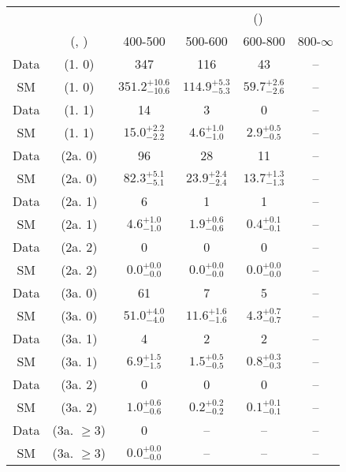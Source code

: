 \begin{table}[h!]
\tiny
\centering
{}
\begin{tabular}
{cccccc}
	\hline\hline
&	&	& \multicolumn{4}{c}{\scalht (\gev)}\\ 
	&	 (\njet, \nb) & 400-500 & 500-600 & 600-800 & 800-$\infty$ \\ [0.8ex] 
\hline
	Data & (1. 0) & 347 & 116 & 43 & -- \\[0.5ex] 
	SM & (1. 0) & $351.2^{+ 10.6 }_{- 10.6 }$ & $114.9^{+ 5.3 }_{- 5.3 }$ & $59.7^{+ 2.6 }_{- 2.6 }$ & -- \\[0.5ex] 
	Data & (1. 1) & 14 & 3 & 0 & -- \\[0.5ex] 
	SM & (1. 1) & $15.0^{+ 2.2 }_{- 2.2 }$ & $4.6^{+ 1.0 }_{- 1.0 }$ & $2.9^{+ 0.5 }_{- 0.5 }$ & -- \\[0.5ex] 
	Data & (2a. 0) & 96 & 28 & 11 & -- \\[0.5ex] 
	SM & (2a. 0) & $82.3^{+ 5.1 }_{- 5.1 }$ & $23.9^{+ 2.4 }_{- 2.4 }$ & $13.7^{+ 1.3 }_{- 1.3 }$ & -- \\[0.5ex] 
	Data & (2a. 1) & 6 & 1 & 1 & -- \\[0.5ex] 
	SM & (2a. 1) & $4.6^{+ 1.0 }_{- 1.0 }$ & $1.9^{+ 0.6 }_{- 0.6 }$ & $0.4^{+ 0.1 }_{- 0.1 }$ & -- \\[0.5ex] 
	Data & (2a. 2) & 0 & 0 & 0 & -- \\[0.5ex] 
	SM & (2a. 2) & $0.0^{+ 0.0 }_{- 0.0 }$ & $0.0^{+ 0.0 }_{- 0.0 }$ & $0.0^{+ 0.0 }_{- 0.0 }$ & -- \\[0.5ex] 
	Data & (3a. 0) & 61 & 7 & 5 & -- \\[0.5ex] 
	SM & (3a. 0) & $51.0^{+ 4.0 }_{- 4.0 }$ & $11.6^{+ 1.6 }_{- 1.6 }$ & $4.3^{+ 0.7 }_{- 0.7 }$ & -- \\[0.5ex] 
	Data & (3a. 1) & 4 & 2 & 2 & -- \\[0.5ex] 
	SM & (3a. 1) & $6.9^{+ 1.5 }_{- 1.5 }$ & $1.5^{+ 0.5 }_{- 0.5 }$ & $0.8^{+ 0.3 }_{- 0.3 }$ & -- \\[0.5ex] 
	Data & (3a. 2) & 0 & 0 & 0 & -- \\[0.5ex] 
	SM & (3a. 2) & $1.0^{+ 0.6 }_{- 0.6 }$ & $0.2^{+ 0.2 }_{- 0.2 }$ & $0.1^{+ 0.1 }_{- 0.1 }$ & -- \\[0.5ex] 
	Data & (3a. $\ge3$) & 0 & -- & -- & -- \\[0.5ex] 
	SM & (3a. $\ge3$) & $0.0^{+ 0.0 }_{- 0.0 }$ & -- & -- & -- \\[0.5ex] 

\end{tabular}
\end{table}
